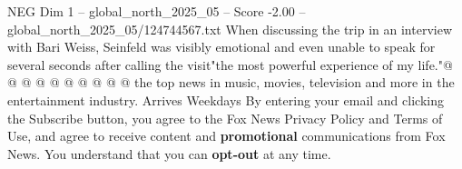 \begin{textsample}{NEG Dim 1 – global\_north\_2025\_05 – Score -2.00 – global\_north\_2025\_05/124744567.txt}
When discussing the trip in an interview with Bari Weiss, Seinfeld was visibly emotional and even unable to speak for several seconds after calling the visit"the most powerful experience of my life."@ @ @ @ @ @ @ @ @ @ the top news in music, movies, television and more in the entertainment industry.
Arrives Weekdays By entering your email and clicking the Subscribe button, you agree to the Fox News Privacy Policy and Terms of Use, and agree to receive content and \textbf{promotional} communications from Fox News.
You understand that you can \textbf{opt-out} at any time.

\end{textsample}

